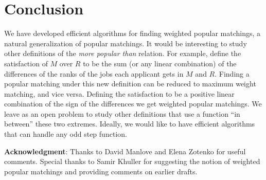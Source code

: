 \documentclass[11pt]{article}
\begin{document}
\section{Conclusion}

We have developed efficient algorithms for finding weighted popular matchings, a natural generalization of popular matchings. It would be interesting to study other definitions of the \emph{more popular than} relation. For example, define the satisfaction of $M$ over $R$ to be the sum (or any linear combination) of the differences of the ranks of the jobs each applicant gets in $M$ and $R$. Finding a popular matching under this new definition can be reduced to maximum weight matching, and vice versa. Defining the satisfaction to be a positive linear combination of the sign of the differences we get weighted popular matchings. We leave as an open problem to study other definitions that use a function ``in between'' these two extremes. Ideally, we would like to have efficient algorithms that can handle any odd step function.

\hspace{0.5cm}

{\bf Acknowledgment}: Thanks to David Manlove and Elena Zotenko for useful comments. Special thanks to Samir Khuller for suggesting the notion of weighted popular matchings and providing comments on earlier drafts.



\end{document}
